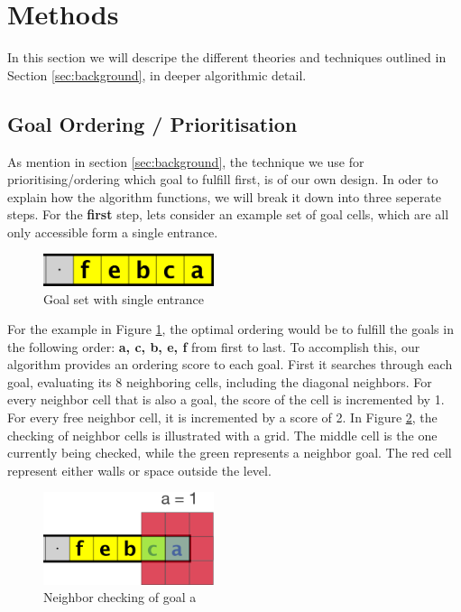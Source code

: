 \section{Methods}
\label{sec:methods}
In this section we will descripe the different theories and techniques outlined in Section \ref{sec:background}, in deeper algorithmic detail. 

\subsection{Goal Ordering / Prioritisation}
\label{methods:goal_ordering}
As mention in section \ref{sec:background}, the technique we use for prioritising/ordering which goal to fulfill first, is of our own design. In oder to explain how the algorithm functions, we will break it down into three seperate steps. For the \textbf{first} step, lets consider an example set of goal cells, which are all only accessible form a single entrance. 
\break
\begin{figure}[ht!]
\centering
\includegraphics[width=50mm]{graphics/ie_level.png}
\caption{Goal set with single entrance\label{fig:sample}}
\end{figure}

For the example in Figure \ref{fig:sample}, the optimal ordering would be to fulfill the goals in the following order: \textbf{a, c, b, e, f} from first to last. To accomplish this, our algorithm provides an ordering score to each goal. First it searches through each goal, evaluating its 8 neighboring cells, including the diagonal neighbors. For every neighbor cell that is also a goal, the score of the cell is incremented by 1. For every free neighbor cell, it is incremented by a score of 2. In Figure \ref{fig:grid1}, the checking of neighbor cells is illustrated with a grid. The middle cell is the one currently being checked, while the green represents a neighbor goal. The red cell represent either walls or space outside the level. 

\begin{figure}[ht!]
\centering
\includegraphics[width=50mm]{graphics/goal_pri_1.png}
\caption{Neighbor checking of goal a\label{fig:grid1}}
\end{figure}

